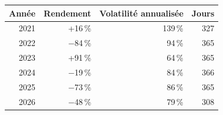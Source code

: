 \begin{tabular}{rrrr}\toprule
Année & Rendement & Volatilité annualisée & Jours \\\midrule
2021 & +16\,\% & 139\,\% & 327 \\
2022 & $-$84\,\% & 94\,\% & 365 \\
2023 & +91\,\% & 64\,\% & 365 \\
2024 & $-$19\,\% & 84\,\% & 366 \\
2025 & $-$73\,\% & 86\,\% & 365 \\
2026 & $-$48\,\% & 79\,\% & 308 \\
\bottomrule\end{tabular}
